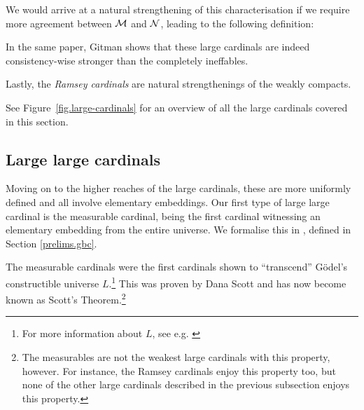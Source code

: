 \documentclass[../../main]{subfiles}
\begin{document}

We would arrive at a natural strengthening of this characterisation if we require more agreement between $\operatorname{\mathcal M}$ and $\operatorname{\mathcal N}$, leading to the following definition:


In the same paper, Gitman shows that these large cardinals are indeed consistency-wise stronger than the completely ineffables.


Lastly, the \textit{Ramsey cardinals} are natural strengthenings of the weakly compacts.


See Figure~\ref{fig.large-cardinals} for an overview of all the large cardinals covered in this section.

\subsection{Large large cardinals}

Moving on to the higher reaches of the large cardinals, these are more uniformly defined and all involve elementary embeddings. Our first type of large large cardinal is the measurable cardinal, being the first cardinal witnessing an elementary embedding from the entire universe. We formalise this in \gbc, defined in Section \ref{prelims.gbc}.


The measurable cardinals were the first cardinals shown to ``transcend'' G\"odel's constructible universe $L$.\footnote{For more information about $L$, see e.g. \cite{SchindlerBook}} This was proven by Dana Scott and has now become known as Scott's Theorem.\footnote{The measurables are not the weakest large cardinals with this property, however. For instance, the Ramsey cardinals enjoy this property too, but none of the other large cardinals described in the previous subsection enjoys this property.}
\end{document}
